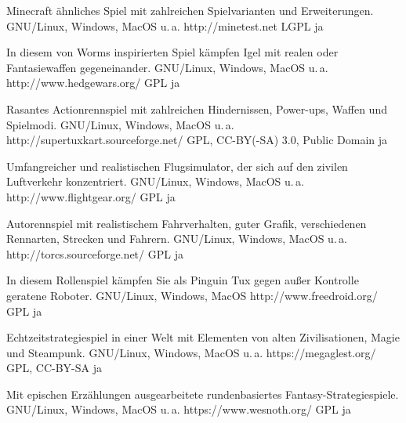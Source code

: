 



{Minecraft ähnliches Spiel mit zahlreichen Spielvarianten und Erweiterungen.}
{GNU/Linux, Windows, MacOS u.\,a.}
{http://minetest.net}
{LGPL}
{ja}

{In diesem von Worms inspirierten Spiel kämpfen Igel mit realen oder Fantasiewaffen gegeneinander.}
{GNU/Linux, Windows, MacOS u.\,a.}
{http://www.hedgewars.org/}
{GPL}
{ja}

{Rasantes Actionrennspiel mit zahlreichen Hindernissen, Power-ups, Waffen und Spielmodi.}
{GNU/Linux, Windows, MacOS u.\,a.}
{http://supertuxkart.sourceforge.net/}
{GPL, CC-BY(-SA) 3.0, Public Domain}
{ja} 	%

{Umfangreicher und realistischen Flugsimulator, der sich auf den zivilen Luftverkehr konzentriert.}
{GNU/Linux, Windows, MacOS u.\,a.}
{http://www.flightgear.org/}
{GPL}
{ja}

{Autorennspiel mit realistischem Fahrverhalten, guter Grafik, verschiedenen Rennarten, Strecken und Fahrern.}
{GNU/Linux, Windows, MacOS u.\,a.}
{http://torcs.sourceforge.net/}
{GPL}
{ja} %


{In diesem Rollenspiel kämpfen Sie als Pinguin Tux gegen außer Kontrolle geratene Roboter.}
{GNU/Linux, Windows, MacOS}
{http://www.freedroid.org/}
{GPL}
{ja} %

{Echtzeitstrategiespiel in einer Welt mit Elementen von alten Zivilisationen, Magie und Steampunk.}
{GNU/Linux, Windows, MacOS u.\,a.}
{https://megaglest.org/}
{GPL, CC-BY-SA}
{ja}

{Mit epischen Erzählungen ausgearbeitete rundenbasiertes Fantasy-Strategiespiele.}
{GNU/Linux, Windows, MacOS u.\,a.}
{https://www.wesnoth.org/}
{GPL}
{ja}

\backpage


